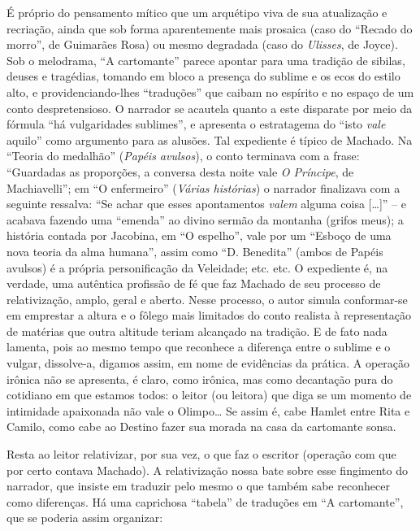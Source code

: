 É próprio do pensamento mítico que um arquétipo viva de sua atualização
e recriação, ainda que sob forma aparentemente mais prosaica (caso do
``Recado do morro'', de Guimarães Rosa) ou mesmo degradada (caso do
\emph{Ulisses}, de Joyce). Sob o melodrama, ``A cartomante'' parece
apontar para uma tradição de sibilas, deuses e tragédias, tomando em
bloco a presença do sublime e os ecos do estilo alto, e
providenciando-lhes ``traduções'' que caibam no espírito e no espaço de
um conto despretensioso. O narrador se acautela quanto a este disparate
por meio da fórmula ``há vulgaridades sublimes'', e apresenta o
estratagema do ``isto \emph{vale} aquilo'' como argumento para as
alusões. Tal expediente é típico de Machado. Na ``Teoria do medalhão''
(\emph{Papéis avulsos}), o conto terminava com a frase: ``Guardadas as
proporções, a conversa desta noite vale \emph{O Príncipe}, de
Machiavelli''; em ``O enfermeiro'' (\emph{Várias histórias}) o narrador
finalizava com a seguinte ressalva: ``Se achar que esses apontamentos
\emph{valem} alguma coisa {[}\ldots{}{]}'' -- e acabava fazendo uma
``emenda'' ao divino sermão da montanha (grifos meus); a história
contada por Jacobina, em ``O espelho'', vale por um ``Esboço de uma nova
teoria da alma humana'', assim como ``D. Benedita'' (ambos de Papéis
avulsos) é a própria personificação da Veleidade; etc. etc. O expediente
é, na verdade, uma autêntica profissão de fé que faz Machado de seu
processo de relativização, amplo, geral e aberto. Nesse processo, o
autor simula conformar-se em emprestar a altura e o fôlego mais
limitados do conto realista à representação de matérias que outra
altitude teriam alcançado na tradição. E de fato nada lamenta, pois ao
mesmo tempo que reconhece a diferença entre o sublime e o vulgar,
dissolve-a, digamos assim, em nome de evidências da prática. A operação
irônica não se apresenta, é claro, como irônica, mas como decantação
pura do cotidiano em que estamos todos: o leitor (ou leitora) que diga
se um momento de intimidade apaixonada não vale o Olimpo\ldots{} Se
assim é, cabe Hamlet entre Rita e Camilo, como cabe ao Destino fazer sua
morada na casa da cartomante sonsa.

Resta ao leitor relativizar, por sua vez, o que faz o escritor (operação
com que por certo contava Machado). A relativização nossa bate sobre
esse fingimento do narrador, que insiste em traduzir pelo mesmo o que
também sabe reconhecer como diferenças. Há uma caprichosa ``tabela'' de
traduções em ``A cartomante'', que se poderia assim organizar:

